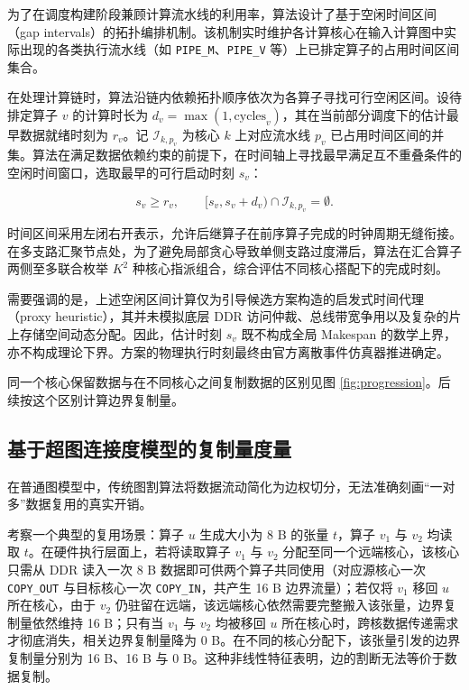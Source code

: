 \documentclass[anonymous,notoc]{gmcm2026}
\begin{document}
为了在调度构建阶段兼顾计算流水线的利用率，算法设计了基于空闲时间区间（gap intervals）的拓扑编排机制。该机制实时维护各计算核心在输入计算图中实际出现的各类执行流水线（如 \texttt{PIPE\_M}、\texttt{PIPE\_V} 等）上已排定算子的占用时间区间集合。

在处理计算链时，算法沿链内依赖拓扑顺序依次为各算子寻找可行空闲区间。设待排定算子 \(v\) 的计算时长为 \(d_v = \max(1, \text{cycles}_v)\)，其在当前部分调度下的估计最早数据就绪时刻为 \(r_v\)。记 \(\mathcal{I}_{k, p_v}\) 为核心 \(k\) 上对应流水线 \(p_v\) 已占用时间区间的并集。算法在满足数据依赖约束的前提下，在时间轴上寻找最早满足互不重叠条件的空闲时间窗口，选取最早的可行启动时刻 \(s_v\)：

\begin{equation}
s_v \ge r_v, \qquad [s_v, s_v + d_v) \cap \mathcal{I}_{k, p_v} = \emptyset.
\end{equation}

时间区间采用左闭右开表示，允许后继算子在前序算子完成的时钟周期无缝衔接。在多支路汇聚节点处，为了避免局部贪心导致单侧支路过度滞后，算法在汇合算子两侧至多联合枚举 \(K^2\) 种核心指派组合，综合评估不同核心搭配下的完成时刻。

需要强调的是，上述空闲区间计算仅为引导候选方案构造的启发式时间代理（proxy heuristic），其并未模拟底层 DDR 访问仲裁、总线带宽争用以及复杂的片上存储空间动态分配。因此，估计时刻 \(s_v\) 既不构成全局 Makespan 的数学上界，亦不构成理论下界。方案的物理执行时刻最终由官方离散事件仿真器推进确定。

同一个核心保留数据与在不同核心之间复制数据的区别见图 \ref{fig:progression}。后续按这个区别计算边界复制量。

\subsection{基于超图连接度模型的复制量度量}

在普通图模型中，传统图割算法将数据流动简化为边权切分，无法准确刻画``一对多''数据复用的真实开销。

考察一个典型的复用场景：算子 \(u\) 生成大小为 8 B 的张量 \(t\)，算子 \(v_1\) 与 \(v_2\) 均读取 \(t\)。在硬件执行层面上，若将读取算子 \(v_1\) 与 \(v_2\) 分配至同一个远端核心，该核心只需从 DDR 读入一次 8 B 数据即可供两个算子共同使用（对应源核心一次 \texttt{COPY\_OUT} 与目标核心一次 \texttt{COPY\_IN}，共产生 16 B 边界流量）；若仅将 \(v_1\) 移回 \(u\) 所在核心，由于 \(v_2\) 仍驻留在远端，该远端核心依然需要完整搬入该张量，边界复制量依然维持 16 B；只有当 \(v_1\) 与 \(v_2\) 均被移回 \(u\) 所在核心时，跨核数据传递需求才彻底消失，相关边界复制量降为 0 B。在不同的核心分配下，该张量引发的边界复制量分别为 16 B、16 B 与 0 B。这种非线性特征表明，边的割断无法等价于数据复制。
\end{document}
